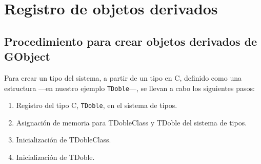 %

\section{Registro de objetos derivados}
\subsection{Procedimiento para crear objetos derivados de \textsf{GObject}}
Para crear un tipo del sistema, a partir de un tipo en C, definido como una estructura ---en nuestro
ejemplo \texttt{TDoble}---, se llevan a cabo los siguientes pasos:
\begin{enumerate}
  \tightlist
\item Registro del tipo C, \texttt{TDoble}, en el sistema de tipos.
\item Asignación de memoria para \textsf{TDobleClass} y \textsf{TDoble} del sistema de tipos.
\item Inicialización de \textsf{TDobleClass}.
\item Inicialización de \textsf{TDoble}.
\end{enumerate}

